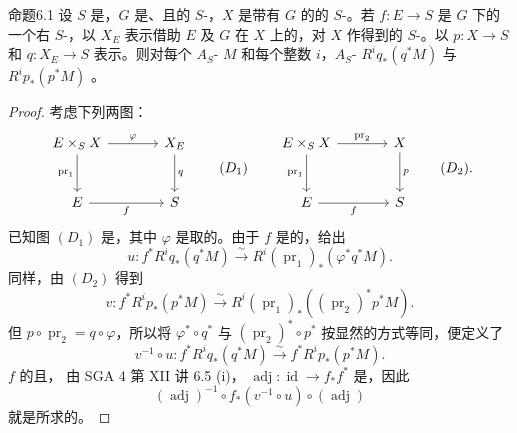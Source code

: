 \begin{SGAresult}{命题}{6.1}
设 $S$ 是，$G$ 是、且的 $S$-，$X$ 是带有 $G$ 的的 $S$-。若 $f:E\to S$ 是 $G$ 下的一个右 $S$-，以 $X_E$ 表示借助 $E$ 及 $G$ 在 $X$ 上的，对 $X$ 作得到的 $S$-。以 $p:X\to S$ 和 $q:X_E\to S$ 表示。则对每个 $A_S$- $M$ 和每个整数 $i$，$A_S$- $R^iq_*(q^*M)$ 与 $R^ip_*(p^*M)$ 。
\end{SGAresult}
\begin{proof}
考虑下列两图：
\[
\begin{tikzcd}[column sep=large,row sep=large]
 E\times_SX\arrow[r,"\varphi"]\arrow[d,"\operatorname{pr}_1"']&X_E\arrow[d,"q"]\\
 E\arrow[r,"f"']&S
\end{tikzcd}
\qquad(D_1)
\qquad
\begin{tikzcd}[column sep=large,row sep=large]
 E\times_SX\arrow[r,"\operatorname{pr}_2"]\arrow[d,"\operatorname{pr}_1"']&X\arrow[d,"p"]\\
 E\arrow[r,"f"']&S
\end{tikzcd}
\qquad(D_2).
\]
已知图 $(D_1)$ 是，其中 $\varphi$ 是取的。由于 $f$ 是的，给出
\[
 u:f^*R^iq_*(q^*M)\xrightarrow{\sim}
 R^i(\operatorname{pr}_1)_*(\varphi^*q^*M).
\]
同样，由 $(D_2)$ 得到
\[
 v:f^*R^ip_*(p^*M)\xrightarrow{\sim}
 R^i(\operatorname{pr}_1)_*((\operatorname{pr}_2)^*p^*M).
\]
但 $p\circ\operatorname{pr}_2=q\circ\varphi$，所以将 $\varphi^*\circ q^*$ 与 $(\operatorname{pr}_2)^*\circ p^*$ 按显然的方式等同，便定义了
\[
 v^{-1}\circ u:f^*R^iq_*(q^*M)\xrightarrow{\sim}f^*R^ip_*(p^*M).
\]
 $f$ 的且，
由 SGA 4 第 XII 讲 6.5 (i)， $\operatorname{adj}:\operatorname{id}\to f_*f^*$ 是，因此
\[
 (\operatorname{adj})^{-1}\circ f_*(v^{-1}\circ u)\circ(\operatorname{adj})
\]
就是所求的。
\end{proof}

